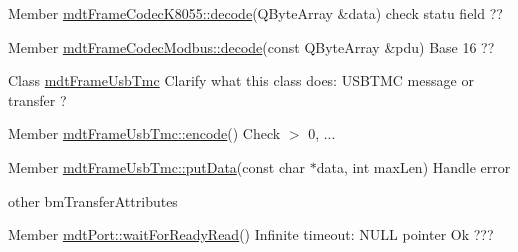 \label{todo__todo000030}
\hypertarget{todo__todo000030}{}
 
\begin{DoxyDescription}
\item[Member \hyperlink{classmdt_frame_codec_k8055_a9dfe60529b0e80d5bbd3852fdea51b18}{mdtFrameCodecK8055::decode}(QByteArray \&data) ]check statu field ?? 
\end{DoxyDescription}

\label{todo__todo000031}
\hypertarget{todo__todo000031}{}
 
\begin{DoxyDescription}
\item[Member \hyperlink{classmdt_frame_codec_modbus_a426f465363a49d70890a462b40677787}{mdtFrameCodecModbus::decode}(const QByteArray \&pdu) ]Base 16 ?? 
\end{DoxyDescription}

\label{todo__todo000035}
\hypertarget{todo__todo000035}{}
 
\begin{DoxyDescription}
\item[Class \hyperlink{classmdt_frame_usb_tmc}{mdtFrameUsbTmc} ]Clarify what this class does: USBTMC message or transfer ?
\end{DoxyDescription}

\label{todo__todo000034}
\hypertarget{todo__todo000034}{}
 
\begin{DoxyDescription}
\item[Member \hyperlink{classmdt_frame_usb_tmc_a9406dddfdd70f5dac729b2dbd728de77}{mdtFrameUsbTmc::encode}() ]Check $>$ 0, ... 
\end{DoxyDescription}

\label{todo__todo000032}
\hypertarget{todo__todo000032}{}
 
\begin{DoxyDescription}
\item[Member \hyperlink{classmdt_frame_usb_tmc_a06d2743a113bd2b4cf2ee44014ecd710}{mdtFrameUsbTmc::putData}(const char $\ast$data, int maxLen) ]Handle error 

other bmTransferAttributes 
\end{DoxyDescription}

\label{todo__todo000002}
\hypertarget{todo__todo000002}{}
 
\begin{DoxyDescription}
\item[Member \hyperlink{classmdt_port_a84594fdb56cd455a366c69b0a9228020}{mdtPort::waitForReadyRead}() ]Infinite timeout: NULL pointer Ok ??? 
\end{DoxyDescription}

